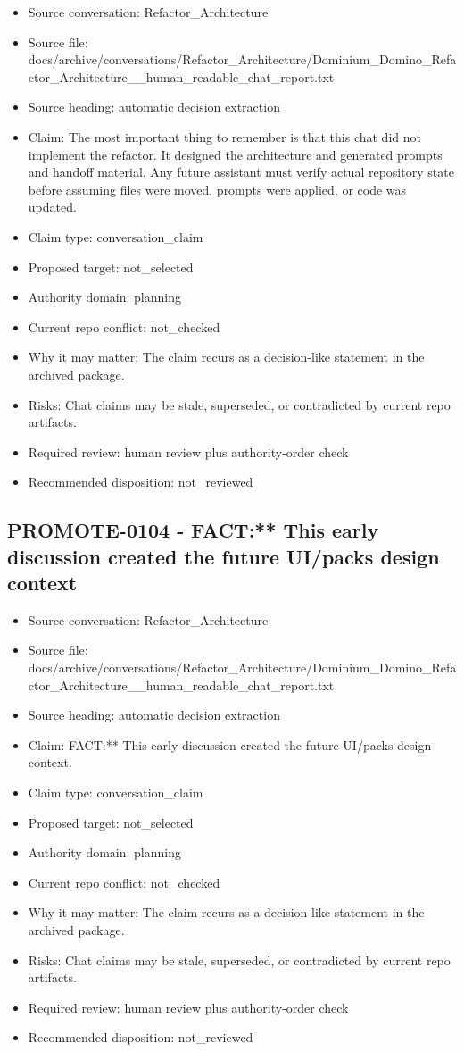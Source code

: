 \documentclass[11pt,a4paper]{report}
\begin{document}
\begin{itemize}
\item Source conversation: Refactor\_Architecture
\item Source file: docs/archive/conversations/Refactor\_Architecture/Dominium\_Domino\_Refactor\_Architecture\_\_human\_readable\_chat\_report.txt
\item Source heading: automatic decision extraction
\item Claim: The most important thing to remember is that this chat did not implement the refactor. It designed the architecture and generated prompts and handoff material. Any future assistant must verify actual repository state before assuming files were moved, prompts were applied, or code was updated.
\item Claim type: conversation\_claim
\item Proposed target: not\_selected
\item Authority domain: planning
\item Current repo conflict: not\_checked
\item Why it may matter: The claim recurs as a decision-like statement in the archived package.
\item Risks: Chat claims may be stale, superseded, or contradicted by current repo artifacts.
\item Required review: human review plus authority-order check
\item Recommended disposition: not\_reviewed
\end{itemize}

\subsection{PROMOTE-0104 - FACT:** This early discussion created the future UI/packs design context}

\begin{itemize}
\item Source conversation: Refactor\_Architecture
\item Source file: docs/archive/conversations/Refactor\_Architecture/Dominium\_Domino\_Refactor\_Architecture\_\_human\_readable\_chat\_report.txt
\item Source heading: automatic decision extraction
\item Claim: FACT:** This early discussion created the future UI/packs design context.
\item Claim type: conversation\_claim
\item Proposed target: not\_selected
\item Authority domain: planning
\item Current repo conflict: not\_checked
\item Why it may matter: The claim recurs as a decision-like statement in the archived package.
\item Risks: Chat claims may be stale, superseded, or contradicted by current repo artifacts.
\item Required review: human review plus authority-order check
\item Recommended disposition: not\_reviewed
\end{itemize}
\end{document}
